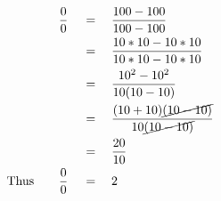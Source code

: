 \begin{align*}
\frac{0}{0}\quad&\,=\quad\frac{100-100}{100-100}\\
\,&\,=\quad\frac{10*10-10*10}{10*10-10*10}\\
\,&\,=\quad\frac{10^2-10^2}{10(10-10)}\\
\,&\,=\quad\frac{(10+10)\cancel{(10-10)}}{10\cancel{(10-10)}}\\
\,&\,=\quad\frac{20}{10}\\
\mathrm{Thus}\qquad\frac{0}{0}\quad&\,=\quad2
\end{align*}
